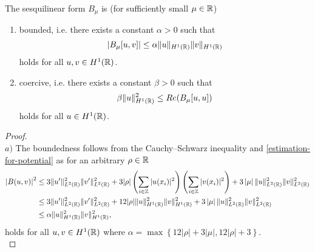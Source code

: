 \begin{theorem} \label{2.1:thm-LaxMilgram}
	The sesquilinear form $B_{\mu}$ is (for sufficiently small $\mu \in \mathbb{R}$)
	\begin{enumerate}[label=\alph*\upshape)]
		\item bounded, i.e. there exists a constant $\alpha > 0$ such that
			\[ \left| B_{\mu}[u,v] \right| \leq \alpha \|u\|_{H^{1}(\mathbb{R})} \|v\|_{H^{1}(\mathbb{R})} \]
			holds for all $u, v \in H^{1}(\mathbb{R})$.
		\item coercive, i.e. there exists a constant $\beta > 0$ such that
			\[ \beta \|u\|_{H^{1}(\mathbb{R})}^{2} \leq Re(B_{\mu}[u, u]) \]
			holds for all $u \in H^{1}(\mathbb{R})$.
	\end{enumerate} 
	
	\begin{proof} ~\\
		$a)$ The boundedness follows from the Cauchy–Schwarz inequality and \eqref{estimation-for-potential} as for an arbitrary $\rho \in \mathbb{R}$
		\begin{align*}
			\left| B(u, v) \right|^{2} & \leq 3 \| u' \|_{L^{2}(\mathbb{R})}^{2} \| v' \|_{L^{2}(\mathbb{R})}^{2} + 3 |\rho |\left( \sum_{i \in \mathbb{Z}} |u(x_{i})|^{2} \right)\left( \sum_{i \in \mathbb{Z}} |v(x_{i})|^{2} \right) + 3 \left| \mu \right| \| u \|_{L^{2}(\mathbb{R})}^{2} \| v \|_{L^{2}(\mathbb{R})}^{2} \\
				& \leq 3 \| u' \|_{L^{2}(\mathbb{R})}^{2} \| v' \|_{L^{2}(\mathbb{R})}^{2} + 12 |\rho| \| u \|^{2}_{H^{1}(\mathbb{R})} \| v \|^{2}_{H^{1}(\mathbb{R})}  + 3 \left| \mu \right| \| u \|_{L^{2}(\mathbb{R})}^{2} \| v \|_{L^{2}(\mathbb{R})}^{2} \\
				& \leq \alpha \| u \|^{2}_{H^{1}(\mathbb{R})} \| v \|^{2}_{H^{1}(\mathbb{R})},
		\end{align*}
		holds for all $u, v \in H^{1}(\mathbb{R})$ where $\alpha = \max \left\{ 12|\rho| + 3\left| \mu \right| , 12 |\rho| + 3 \right\}$. \\
		

\end{proof}
\end{theorem}
